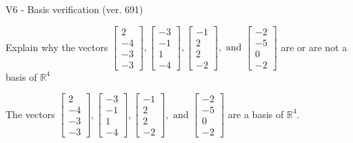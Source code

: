 \begin{exercise}
  \begin{exerciseTitle}V6 - Basis verification (ver. 691)\end{exerciseTitle}
  \begin{exerciseStatement}
    Explain why the vectors \(\left[\begin{array}{r}
2 \\
-4 \\
-3 \\
-3
\end{array}\right] , \left[\begin{array}{r}
-3 \\
-1 \\
1 \\
-4
\end{array}\right] , \left[\begin{array}{r}
-1 \\
2 \\
2 \\
-2
\end{array}\right] , \text{ and } \left[\begin{array}{r}
-2 \\
-5 \\
0 \\
-2
\end{array}\right]\) are or are not a basis of \(\mathbb{R}^4\)	


  \end{exerciseStatement}
  \begin{exerciseAnswer}
   The vectors \(\left[\begin{array}{r}
2 \\
-4 \\
-3 \\
-3
\end{array}\right] , \left[\begin{array}{r}
-3 \\
-1 \\
1 \\
-4
\end{array}\right] , \left[\begin{array}{r}
-1 \\
2 \\
2 \\
-2
\end{array}\right] , \text{ and } \left[\begin{array}{r}
-2 \\
-5 \\
0 \\
-2
\end{array}\right]\) 
  	 are  a basis of \(\mathbb{R}^4\).
  


  \end{exerciseAnswer}
\end{exercise}